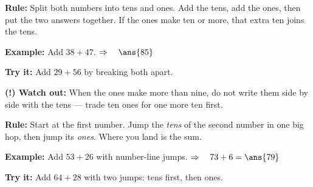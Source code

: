 \documentclass[12pt]{article}
\begin{document}


\begin{formulabox}
\textbf{Rule:} Split both numbers into tens and ones. Add the tens, add the
ones, then put the two answers together. If the ones make ten or more, that
extra ten joins the tens.
\end{formulabox}

\begin{examplebox}
\textbf{Example:} \quad Add $38 + 47$.
$\Rightarrow\quad \ans{85}$
\end{examplebox}

\begin{tryitbox}
\textbf{Try it:} \quad Add $29 + 56$ by breaking both apart.\\[2pt]
\end{tryitbox}

\begin{watchoutbox}
\textbf{(!) Watch out:} When the ones make more than nine, do not write them
side by side with the tens --- trade ten ones for one more ten first.
\end{watchoutbox}


\begin{formulabox}
\textbf{Rule:} Start at the first number. Jump the \emph{tens} of the second
number in one big hop, then jump its \emph{ones}. Where you land is the sum.
\end{formulabox}

\begin{examplebox}
\textbf{Example:} \quad Add $53 + 26$ with number-line jumps.
$\Rightarrow\quad 73 + 6 = \ans{79}$
\end{examplebox}

\begin{tryitbox}
\textbf{Try it:} \quad Add $64 + 28$ with two jumps: tens first, then ones.\\[2pt]
\end{tryitbox}
\end{document}
